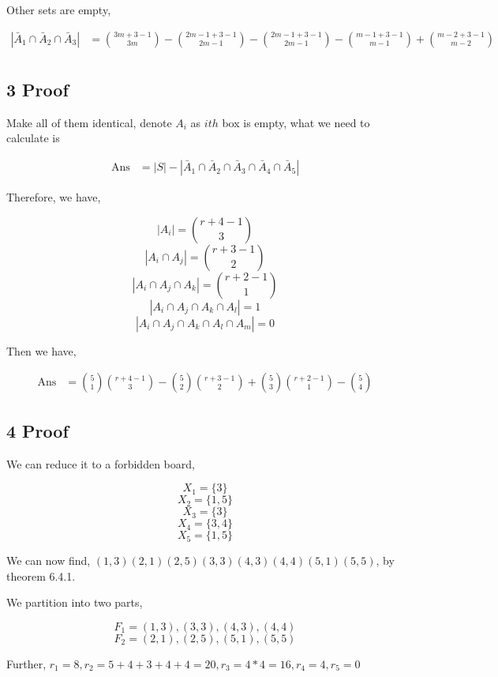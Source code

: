 \documentclass{article}
\begin{document}
Other sets are empty,

\[
\begin{split}
|\bar A_1 \cap \bar A_2 \cap \bar A_3| &= {3m + 3 - 1 \choose 3m} - {2m - 1 + 3 - 1 \choose 2m - 1} - {2m - 1 + 3 - 1 \choose 2m - 1} - {m - 1 + 3 - 1 \choose m - 1} + {m - 2 + 3 - 1 \choose m - 2}  \\
\end{split}
\]


\subsection*{3 Proof}

Make all of them identical, denote $A_i$ as $ith$ box is empty, what we need to calculate is 

\[
\begin{split}
\text{Ans} &= |S| - |\bar A_1 \cap \bar A_2 \cap \bar A_3 \cap \bar A_4 \cap \bar A_5|
\end{split}
\]

Therefore, we have,

$$|A_i| = {r + 4 - 1 \choose 3}$$
$$|A_i \cap A_j| = {r + 3 - 1 \choose 2}$$
$$|A_i \cap A_j \cap A_k| = {r + 2 - 1 \choose 1}$$
$$|A_i \cap A_j \cap A_k \cap A_l | = 1 $$
$$|A_i \cap A_j \cap A_k \cap A_l \cap A_m| = 0$$

Then we have,

\[
\begin{split}
\text{Ans} &= {5 \choose 1} {r + 4 - 1 \choose 3} - {5 \choose 2}{r + 3  - 1 \choose 2} + {5 \choose 3}{r + 2 - 1 \choose 1} - {5 \choose 4}
\end{split}
\]

\subsection*{4 Proof}

We can reduce it to a forbidden board, 

$$X_1 = \{ 3 \}$$
$$X_2 = \{ 1, 5 \}$$
$$X_3 = \{ 3 \}$$
$$X_4 = \{ 3, 4 \}$$
$$X_5 = \{ 1, 5 \}$$

We can now find, $(1, 3) (2, 1) (2, 5) (3, 3) (4, 3) (4, 4) (5, 1) (5, 5)$, by theorem 6.4.1.

We partition into two parts, 

$$F_1 = (1,3), (3,3), (4,3), (4,4)$$
$$F_2 = (2,1), (2,5), (5,1), (5,5)$$

Further, $r_1 = 8, r_2 = 5 + 4 + 3 + 4 +4 = 20, r_3 = 4 * 4 = 16, r_4 = 4, r_5 = 0$
\end{document}
